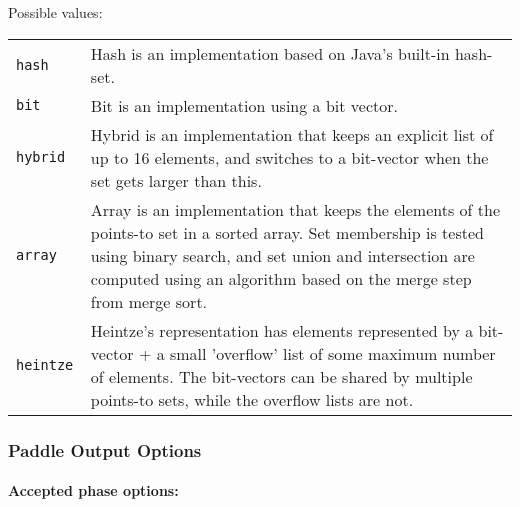 \documentclass{article}
\begin{document}
\begin{description}
Possible values:\\
\begin{longtable}{p{1in}p{4in}}

{\tt hash }
&

Hash is an implementation based on Java's built-in hash-set.
\\

{\tt bit }
&

Bit is an implementation using a bit vector.
\\

{\tt hybrid }
&

Hybrid is an implementation that keeps an explicit list of up to
16 elements, and switches to a bit-vector when the set gets
larger than this.
\\

{\tt array }
&

Array is an implementation that keeps the elements of the
points-to set in a sorted array. Set membership is tested using
binary search, and set union and intersection are computed using
an algorithm based on the merge step from merge sort.
\\

{\tt heintze }
&
Heintze's representation has elements represented by a bit-vector + a small
									'overflow' list of some maximum number of elements.  The bit-vectors can be shared
									by multiple points-to sets, while the overflow lists are not.
								\\

\end{longtable}


\end{description}

\subsubsection{Paddle Output Options}


\paragraph{Accepted phase options:} 
\end{document}
